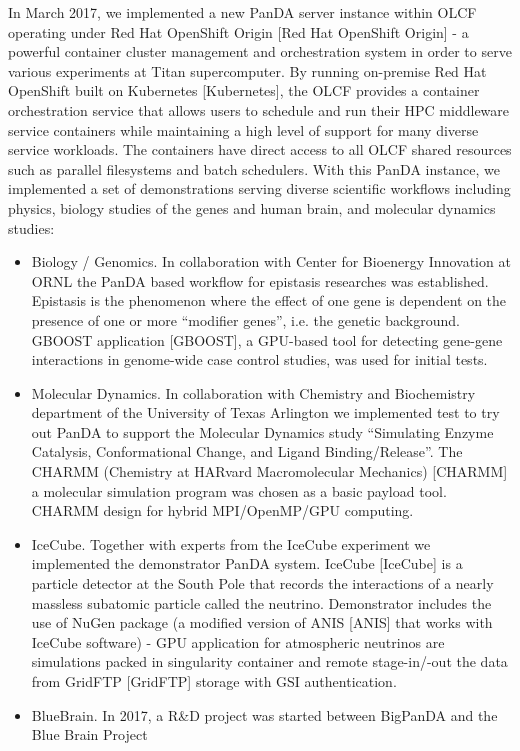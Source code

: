 In March 2017, we implemented a new PanDA server instance within OLCF operating
under Red Hat OpenShift Origin [Red Hat OpenShift Origin] - a powerful
container cluster management and orchestration system in order to serve various
experiments at Titan supercomputer. By running on-premise Red Hat OpenShift
built on Kubernetes [Kubernetes], the OLCF provides a container orchestration
service that allows users to schedule and run their HPC middleware service
containers while maintaining a high level of support for many diverse service
workloads. The containers have direct access to all OLCF shared resources such
as parallel filesystems and batch schedulers. With this PanDA instance, we
implemented a set of demonstrations serving diverse scientific workflows
including physics, biology studies of the genes and human brain, and molecular
dynamics studies:
\begin{itemize}
    \item Biology / Genomics. 
In collaboration with Center for Bioenergy Innovation at ORNL the PanDA based
workflow for epistasis researches was established. Epistasis is the phenomenon
where the effect of one gene is dependent on the presence of one or more
``modifier genes'', i.e. the genetic background. GBOOST application [GBOOST], a
GPU-based tool for detecting gene-gene interactions in genome-wide case control
studies, was used for initial tests.
    \item Molecular Dynamics.
In collaboration with Chemistry and Biochemistry department of the University
of Texas Arlington we implemented test to try out PanDA to support the
Molecular Dynamics study ``Simulating Enzyme Catalysis, Conformational Change,
and Ligand Binding/Release''. The CHARMM (Chemistry at HARvard Macromolecular
Mechanics) [CHARMM] a molecular simulation program was chosen as a basic
payload tool. CHARMM design for hybrid MPI/OpenMP/GPU computing.
    \item IceCube. 
Together with  experts from the IceCube experiment we implemented the
demonstrator PanDA system. IceCube [IceCube] is a particle detector at the
South Pole that records the interactions of a nearly massless subatomic
particle called the neutrino. Demonstrator includes the use of NuGen package (a
modified version of ANIS [ANIS] that works with IceCube software) - GPU
application for atmospheric neutrinos are simulations packed in singularity
container and remote stage-in/-out the data from GridFTP [GridFTP] storage with
GSI authentication. 
    \item BlueBrain.
In 2017, a R\&D project was started between BigPanDA and the Blue Brain Project

\end{itemize}
